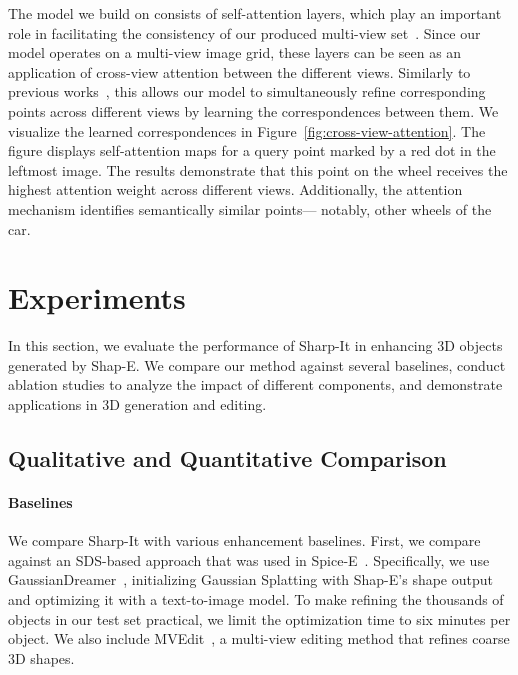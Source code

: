 The model we build on consists of self-attention layers, which play an important role in facilitating the consistency of our produced multi-view set~\cite{shi2024mvdream, wang2023imagedream}. Since our model operates on a multi-view image grid, these layers can be seen as an application of cross-view attention between the different views. Similarly to previous works~\cite{wang2023imagedream, shi2024mvdream, shi2023zero123singleimageconsistent}, this allows our model to simultaneously refine corresponding points across different views by learning the correspondences between them. 
We visualize the learned correspondences in Figure~\ref{fig:cross-view-attention}. The figure displays self-attention maps for a query point marked by a red dot in the leftmost image. The results demonstrate that this point on the wheel receives the highest attention weight across different views. Additionally, the attention mechanism identifies semantically similar points— notably, other wheels of the car.







\section{Experiments}
In this section, we evaluate the performance of Sharp-It in enhancing 3D objects generated by Shap-E. We compare our method against several baselines, conduct ablation studies to analyze the impact of different components, and demonstrate applications in 3D generation and editing.

\subsection{Qualitative and Quantitative Comparison}

\paragraph{Baselines}

We compare Sharp-It with various enhancement baselines. First, we compare against an SDS-based approach that was used in Spice-E~\cite{sella2024spicee}. Specifically, we use GaussianDreamer~\cite{yi2024gaussiandreamerfastgenerationtext}, initializing Gaussian Splatting with Shap-E's shape output and optimizing it with a text-to-image model. 
To make refining the thousands of objects in our test set practical, we limit the optimization time to six minutes per object.
We also include MVEdit~\cite{mvedit2024}, a multi-view editing method that refines coarse 3D shapes.

